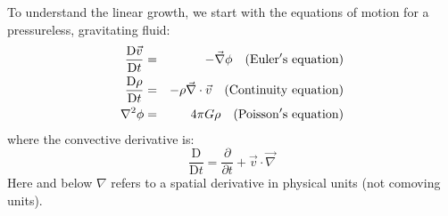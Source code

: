 To understand the linear growth, we start with the equations of motion
for a pressureless, gravitating fluid:
\begin{eqnarray}
\label{eq:homogeneous}
\frac{\mathrm{D}\vec{v}}{\mathrm{D}t} &=& - \vec\nabla\phi
\mathrm{\quad (Euler's~equation)}\cr
\frac{\mathrm{D}\rho}{\mathrm{D}t} &=& - \rho \vec\nabla\cdot \vec{v}
\mathrm{\quad (Continuity~equation)}\cr
\nabla^2\phi &=& 4\pi G \rho 
\mathrm{\quad (Poisson's~equation)}
\end{eqnarray}
where the convective derivative is:
\begin{equation}
\frac{\mathrm{D}}{\mathrm{D}t} = \frac{\partial}{\partial t} +
\vec{v}\cdot\vec{\nabla}
\end{equation}
Here and below $\nabla$ refers to a spatial derivative in physical
units (not comoving units).

